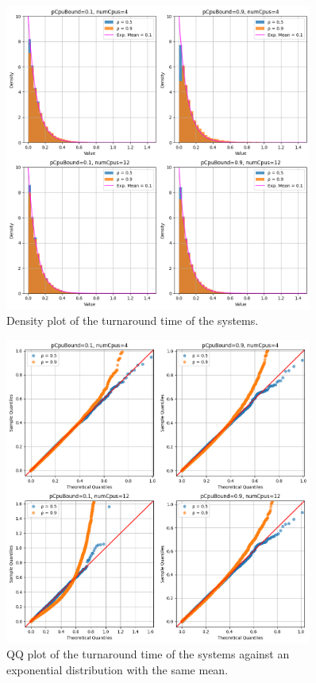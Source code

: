 \begin{figure}[H]
    \captionsetup{type=figure}
    \centering
    \includegraphics[width=0.9\textwidth]{./images/04/sjf/turn/density.png}
    \caption{Density plot of the turnaround time of the systems.}
    \label{fig:sjfTurnDensity}
\end{figure}

\begin{figure}[H]
    \captionsetup{type=figure}
    \centering
    \includegraphics[width=0.9\textwidth]{./images/04/sjf/turn/qq.png}
    \caption{QQ plot of the turnaround time of the systems against an exponential distribution with the same mean.}
    \label{fig:sjfTurnQQ}
\end{figure}

